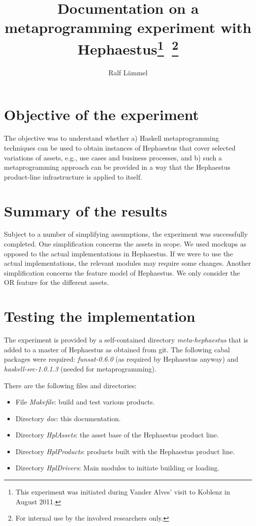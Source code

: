 \documentclass{article}
\title{Documentation on a metaprogramming experiment with Hephaestus\thanks{This experiment was initiated during Vander Alves' visit to Koblenz in August 2011.}\ \thanks{For internal use by the involved researchers only.}}
\author{Ralf L\"ammel}
\begin{document}
\maketitle

\tableofcontents

\section{Objective of the experiment}

The objective was to understand whether a) Haskell metaprogramming techniques can be used to obtain instances of Hephaestus that cover selected variations of assets, e.g., use cases and business processes, and b) such a metaprogramming approach can be provided in a way that the Hephaestus product-line infrastructure is applied to itself.

\section{Summary of the results}

Subject to a number of simplifying assumptions, the experiment was successfully completed. One simplification concerns the assets in scope. We used mockups as opposed to the actual implementations in Hephaestus. If we were to use the actual implementations, the relevant modules may require some changes. Another simplification concerns
the feature model of Hephaestus. We only consider the OR feature for the different assets.

\section{Testing the implementation}

The experiment is provided by a self-contained directory \emph{meta-hephaestus} that is added to a master of Hephaestus as obtained from git. The following cabal packages were required: \emph{funsat-0.6.0} (as required by Hephaestus anyway) and \emph{haskell-src-1.0.1.3} (needed for metaprogramming).

There are the following files and directories:

\begin{itemize}

\item File \emph{Makefile}: build and test various products.

\item Directory \emph{doc}: this documentation.

\item Directory \emph{HplAssets}: the asset base of the Hephaestus product line.

\item Directory \emph{HplProducts}: products built with the Hephaestus product line.

\item Directory \emph{HplDrivers}: Main modules to initiate building or loading.

\end{itemize}
\end{document}
